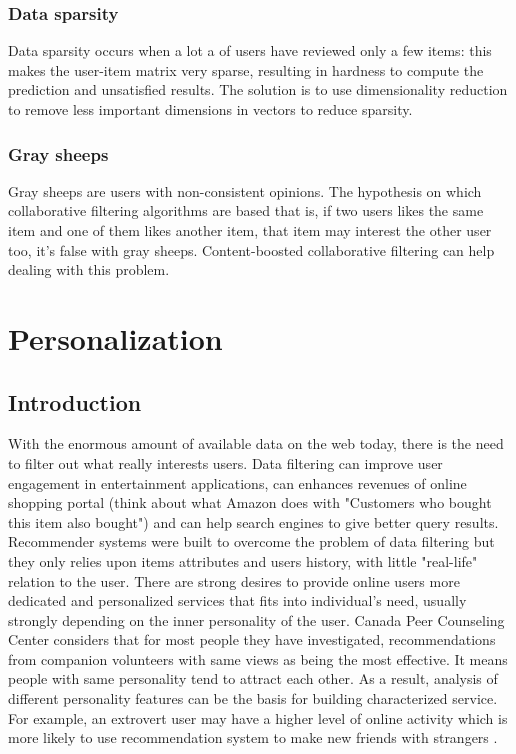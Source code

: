 \documentclass[b5paper,10pt,twoside,cucitura]{toptesi}
\begin{document}
\subsubsection{Data sparsity} Data sparsity occurs when a lot a of users have reviewed only a few items: this makes the user-item matrix very sparse, resulting in hardness to compute the prediction and unsatisfied results. The solution is to use dimensionality reduction to remove less important dimensions in vectors to reduce sparsity.

\subsubsection{Gray sheeps} Gray sheeps are users with non-consistent opinions. The hypothesis on which collaborative filtering algorithms are based that is, if two users likes the same item and one of them likes another item, that item may interest the other user too, it's false with gray sheeps. Content-boosted collaborative filtering can help dealing with this problem.

\section{Personalization}

\subsection{Introduction}

With the enormous amount of available data on the web today, there is the need to filter out what really interests users. Data filtering can improve user engagement in entertainment applications, can enhances revenues of online shopping portal (think about what Amazon does with "Customers who bought this item also bought") and can help search engines to give better query results. Recommender systems were built to overcome the problem of data filtering but they only relies upon items attributes and users history, with little "real-life" relation to the user. There are strong desires to provide online users more dedicated and personalized services that fits into individual's need, usually strongly depending on the inner personality of the user. 
Canada Peer Counseling Center   \citep{chen} considers that for most people they have investigated, recommendations from companion volunteers with same views as being the most effective. It means people with same personality tend to attract each other. As a result, analysis of different personality features can be the basis for building characterized service. For example, an extrovert user may have a higher level of online activity which is more likely to use recommendation system to make new friends with strangers   \citep{moore}.
\end{document}
